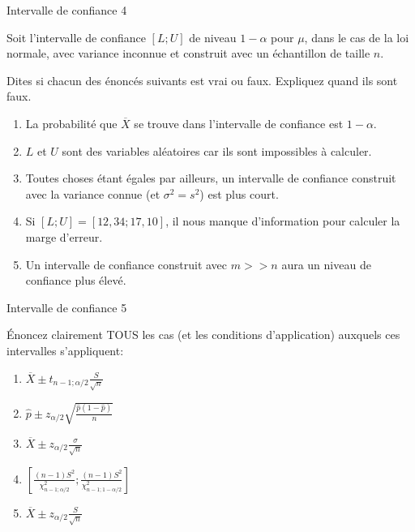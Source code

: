 \documentclass{BeamerTemplate}
\begin{document}
\begin{frame}{Intervalle de confiance 4}\label{ic4}
\begin{center}

Soit l'intervalle de confiance $[L;U]$ de niveau $1-\alpha$ pour $\mu$, dans le cas de la loi normale, avec variance inconnue et construit avec un échantillon de taille $n$.
\medskip

Dites si chacun des énoncés suivants est vrai ou faux. Expliquez quand ils sont faux.

\begin{enumerate}
    \item La probabilité que $\overline{X}$ se trouve dans l'intervalle de confiance est $1-\alpha$.
    \item $L$ et $U$ sont des variables aléatoires car ils sont impossibles à calculer.
    \item Toutes choses étant égales par ailleurs, un intervalle de confiance construit avec la variance connue (et $\sigma^2=s^2$) est plus court.
    \item Si $[L;U]=[12,34;17,10]$, il nous manque d'information pour calculer la marge d'erreur.
    \item Un intervalle de confiance construit avec $m>>n$ aura un niveau de confiance plus élevé.
\end{enumerate}

\end{center}

\end{frame}

\begin{frame}{Intervalle de confiance 5}\label{ic5}
\begin{center}

Énoncez clairement TOUS les cas (et les conditions d'application) auxquels ces intervalles s'appliquent:

\begin{enumerate}
    \item $\displaystyle \overline{X}\pm t_{n-1;\alpha/2}\frac{S}{\sqrt{n}}$
    \item $\displaystyle \widehat{p}\pm z_{\alpha/2}\sqrt{\frac{\widehat{p}(1-\widehat{p})}{n}}$
    \item $\displaystyle \overline{X}\pm z_{\alpha/2}\frac{\sigma}{\sqrt{n}}$
    \item $\displaystyle \left[\frac{(n-1)S^2}{\chi^2_{n-1;\alpha/2}};\frac{(n-1)S^2}{\chi^2_{n-1;1-\alpha/2}}\right]$
    \item $\displaystyle \overline{X}\pm z_{\alpha/2}\frac{S}{\sqrt{n}}$
    
\end{enumerate}

\end{center}

\end{frame}
\end{document}
